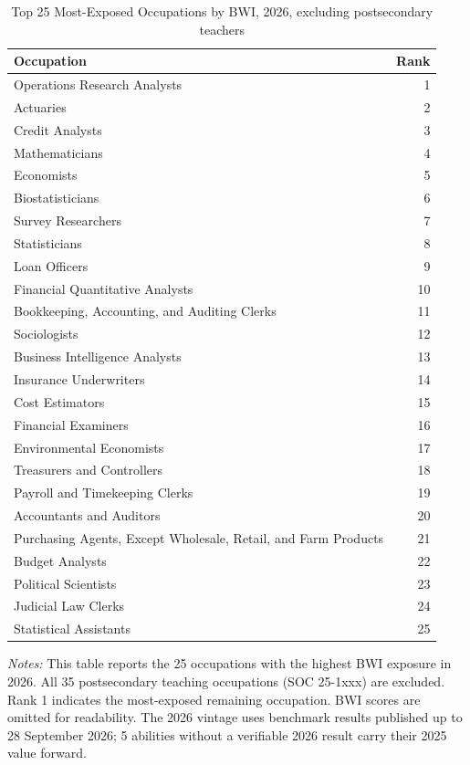 \begin{table}[htbp]\centering
\caption{Top 25 Most-Exposed Occupations by BWI, 2026, excluding postsecondary teachers}\label{tab:table_top25_no_teachers}
\begin{tabular}{lr}\toprule
Occupation & Rank \\ \midrule
Operations Research Analysts & 1 \\
Actuaries & 2 \\
Credit Analysts & 3 \\
Mathematicians & 4 \\
Economists & 5 \\
Biostatisticians & 6 \\
Survey Researchers & 7 \\
Statisticians & 8 \\
Loan Officers & 9 \\
Financial Quantitative Analysts & 10 \\
Bookkeeping, Accounting, and Auditing Clerks & 11 \\
Sociologists & 12 \\
Business Intelligence Analysts & 13 \\
Insurance Underwriters & 14 \\
Cost Estimators & 15 \\
Financial Examiners & 16 \\
Environmental Economists & 17 \\
Treasurers and Controllers & 18 \\
Payroll and Timekeeping Clerks & 19 \\
Accountants and Auditors & 20 \\
Purchasing Agents, Except Wholesale, Retail, and Farm Products & 21 \\
Budget Analysts & 22 \\
Political Scientists & 23 \\
Judicial Law Clerks & 24 \\
Statistical Assistants & 25 \\
\bottomrule\end{tabular}
\begin{minipage}{0.95\linewidth}\footnotesize \textit{Notes:} This table reports the 25 occupations with the highest BWI exposure in 2026. All 35 postsecondary teaching occupations (SOC 25-1xxx) are excluded. Rank 1 indicates the most-exposed remaining occupation. BWI scores are omitted for readability. The 2026 vintage uses benchmark results published up to 28 September 2026; 5 abilities without a verifiable 2026 result carry their 2025 value forward.\end{minipage}
\end{table}
